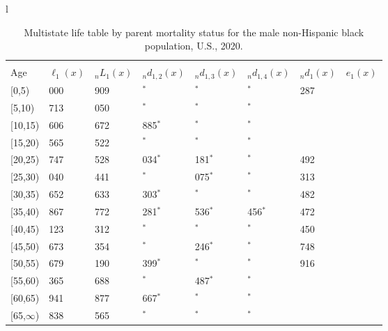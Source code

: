 \documentclass[
]{article}
\begin{document}
\begin{table}
\caption{\label{tab:table-nhblack-male}Multistate life table by parent mortality status for the male non-Hispanic black population, U.S., 2020.}

\centering
\fontsize{9}{11}\selectfont
\begin{tabular}[t]{l}
\hline
\begin{tabular}{>{\raggedright\arraybackslash}p{.45in}>{\raggedleft\arraybackslash}p{.65in}>{\raggedleft\arraybackslash}p{.65in}>{\raggedleft\arraybackslash}p{.65in}>{\raggedleft\arraybackslash}p{.65in}>{\raggedleft\arraybackslash}p{.65in}>{\raggedleft\arraybackslash}p{.65in}>{\raggedleft\arraybackslash}p{.65in}}
\toprule
\multicolumn{1}{c}{ } & \multicolumn{7}{c}{(1) Lost neither} \\
\cmidrule(l{3pt}r{3pt}){2-8}
Age & $\ell_{1}(x)$ & ${}_nL_{1}(x)$ & ${}_nd_{1,2}(x)$ & ${}_nd_{1,3}(x)$ & ${}_nd_{1,4}(x)$ & ${}_nd_{1}(x)$ & $e_{1}(x)$\\
\midrule
{}[0,5) & 100 000 & 490 909 & 0$^{*}$ & 0$^{*}$ & 0$^{*}$ & 1 287 & 41\\
{}[5,10) & 98 713 & 485 050 & 0$^{*}$ & 0$^{*}$ & 0$^{*}$ & 107 & 37\\
{}[10,15) & 98 606 & 465 672 & 2 885$^{*}$ & 0$^{*}$ & 0$^{*}$ & 156 & 32\\
{}[15,20) & 95 565 & 453 522 & 0$^{*}$ & 0$^{*}$ & 0$^{*}$ & 818 & 27\\
{}[20,25) & 94 747 & 465 528 & 3 034$^{*}$ & 1 181$^{*}$ & 0$^{*}$ & 1 492 & 23\\
\addlinespace
{}[25,30) & 89 040 & 396 441 & 0$^{*}$ & 3 075$^{*}$ & 0$^{*}$ & 1 313 & 19\\
{}[30,35) & 84 652 & 373 633 & 2 303$^{*}$ & 0$^{*}$ & 0$^{*}$ & 1 482 & 15\\
{}[35,40) & 80 867 & 301 772 & 17 281$^{*}$ & 7 536$^{*}$ & 2 456$^{*}$ & 1 472 & 11\\
{}[40,45) & 52 123 & 239 312 & 0$^{*}$ & 0$^{*}$ & 0$^{*}$ & 1 450 & 8\\
{}[45,50) & 50 673 & 214 354 & 0$^{*}$ & 9 246$^{*}$ & 0$^{*}$ & 1 748 & 5\\
\addlinespace
{}[50,55) & 39 679 & 167 190 & 8 399$^{*}$ & 0$^{*}$ & 0$^{*}$ & 1 916 & 3\\
{}[55,60) & 29 365 & 54 688 & 0$^{*}$ & 2 487$^{*}$ & 0$^{*}$ & 937 & 1\\
{}[60,65) & 25 941 & 16 877 & 2 667$^{*}$ & 0$^{*}$ & 0$^{*}$ & 436 & 0\\
{}[65,$\infty$) & 22 838 & 12 565 & 0$^{*}$ & 0$^{*}$ & 0$^{*}$ & 881 & 0\\

\end{tabular}
\end{tabular}
\end{table}
\end{document}
